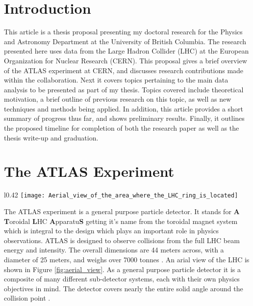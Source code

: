 \documentclass[12pt]{article}
\begin{document}

\newpage
\section{Introduction}

This article is a thesis proposal presenting my doctoral research for the
Physics and Astronomy Department at the University of British Columbia. The
research presented here uses data from the Large Hadron Collider (LHC) at the
European Organization for Nuclear Research (CERN). This proposal gives a brief
overview of the ATLAS experiment at CERN, and discusses research contributions
made within the collaboration. Next it covers topics pertaining to the main
data analysis to be presented as part of my thesis. Topics covered include
theoretical motivation, a brief outline of previous research on this topic, as
well as new techniques and methods being applied. In addition, this article
provides a short summary of progress thus far, and shows preliminary results.
Finally, it outlines the proposed timeline for completion of both the
research paper as well as the thesis write-up and graduation.


\section{The ATLAS Experiment}
\begin{wrapfigure}{l}{0.42\textwidth}
    \centering
    \vspace{-6pt}
    \texttt{[image: Aerial\_view\_of\_the\_area\_where\_the\_LHC\_ring\_is\_located]}
    \caption{Aerial view of the LHC, located in Geneva, Switzerland.}
    \label{fig:aerial_view}
\end{wrapfigure}

The ATLAS experiment is a general purpose particle detector. It stands for
\textbf{A} \textbf{T}oroidal \textbf{L}HC \textbf{A}pparatu\textbf{S} getting
it's name from the toroidal magnet system which is integral to the design which
plays an important role in physics observations. ATLAS is designed to observe
collisions from the full LHC beam energy and intensity. The overall dimensions
are 44 meters across, with a diameter of 25 meters, and weighs over 7000 tonnes
\cite{Aad_2024}. An arial view of the LHC is shown in Figure
\ref{fig:aerial_view}. As a general purpose particle detector it is a composite
of many different sub-detector systems, each with their own physics objectives
in mind. The detector covers nearly the entire solid angle around the collision
point \cite{The_ATLAS_Collaboration_2008}.
\end{document}
